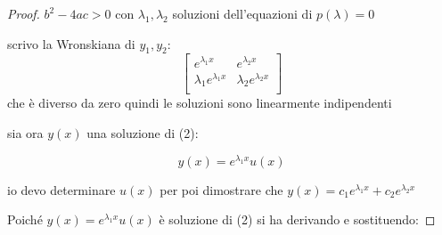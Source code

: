 \begin{proof}
     \(b^{2}-4ac >0\) con \(\lambda_1,\lambda_2\) soluzioni dell'equazioni di \(p(\lambda)=0\)

    scrivo la Wronskiana di \(y_1,y_2\):
    \[
        \begin{bmatrix}

            e ^{\lambda_1 x}          & e ^{\lambda_2 x}          \\
            \lambda_1e ^{\lambda_1 x} & \lambda_2e ^{\lambda_2 x} \\
        \end{bmatrix}
    \]
    che è diverso da zero quindi le soluzioni sono linearmente indipendenti

    sia ora \(y(x)\) una soluzione di (2):

    \[
        y(x) = e ^{\lambda_1 x}u(x)
    \]

    io devo determinare \(u(x)\) per poi dimostrare che \(y(x) = c_1e ^{\lambda_1 x}+c_2 e^{\lambda_2 x}\)

    Poiché \(y(x) = e ^{\lambda_1 x}u(x)\) è soluzione di (2) si ha derivando e sostituendo:


\end{proof}

